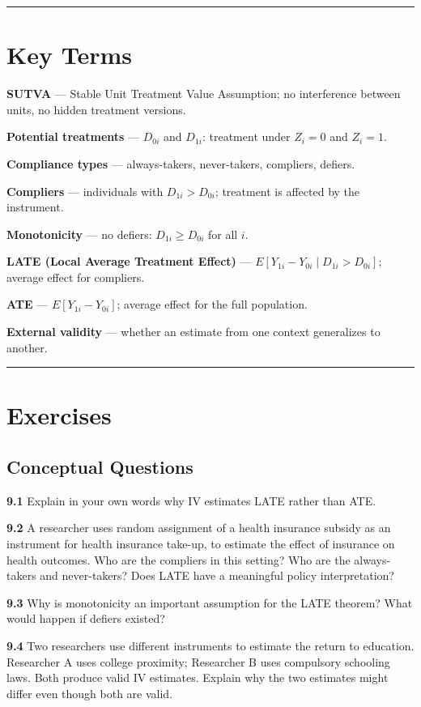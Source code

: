 \medskip\hrule\medskip

\section{Key Terms}

\textbf{SUTVA} --- Stable Unit Treatment Value Assumption; no interference between units, no hidden treatment versions.

\textbf{Potential treatments} --- $D_{0i}$ and $D_{1i}$: treatment under $Z_i = 0$ and $Z_i = 1$.

\textbf{Compliance types} --- always-takers, never-takers, compliers, defiers.

\textbf{Compliers} --- individuals with $D_{1i} > D_{0i}$; treatment is affected by the instrument.

\textbf{Monotonicity} --- no defiers: $D_{1i} \geq D_{0i}$ for all $i$.

\textbf{LATE (Local Average Treatment Effect)} --- $E[Y_{1i} - Y_{0i} \mid D_{1i} > D_{0i}]$; average effect for compliers.

\textbf{ATE} --- $E[Y_{1i} - Y_{0i}]$; average effect for the full population.

\textbf{External validity} --- whether an estimate from one context generalizes to another.

\medskip\hrule\medskip

\section{Exercises}

\subsection{Conceptual Questions}

\textbf{9.1} Explain in your own words why IV estimates LATE rather than ATE.

\textbf{9.2} A researcher uses random assignment of a health insurance subsidy as an instrument for health insurance take-up, to estimate the effect of insurance on health outcomes. Who are the compliers in this setting? Who are the always-takers and never-takers? Does LATE have a meaningful policy interpretation?

\textbf{9.3} Why is monotonicity an important assumption for the LATE theorem? What would happen if defiers existed?

\textbf{9.4} Two researchers use different instruments to estimate the return to education. Researcher A uses college proximity; Researcher B uses compulsory schooling laws. Both produce valid IV estimates. Explain why the two estimates might differ even though both are valid.

